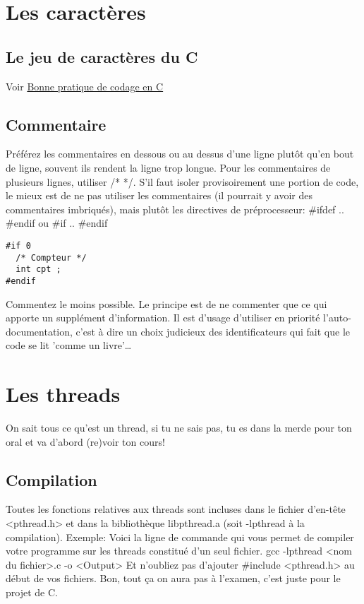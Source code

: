 \documentclass[a4paper]{article}
\begin{document}
\section{Les caractères}
\subsection{Le jeu de caractères du C}
Voir \href{http://emmanuel-delahaye.developpez.com/tutoriels/c/bonnes-pratiques-codage-c/#LI-A}{Bonne pratique de codage en C}
\subsection{Commentaire}
Préférez les commentaires en dessous ou au dessus d'une ligne plutôt qu'en bout de ligne, souvent ils rendent la ligne trop longue. \newline
Pour les commentaires de plusieurs lignes, utiliser /* */.\newline
S'il faut isoler provisoirement une portion de code, le mieux est de ne pas utiliser les commentaires (il pourrait y avoir des commentaires imbriqués), mais plutôt les directives de préprocesseur: \#ifdef .. \#endif ou \#if .. \#endif

\begin{lstlisting}
#if 0
  /* Compteur */
  int cpt ;
#endif
\end{lstlisting}
Commentez le moins possible. Le principe est de ne commenter que ce qui apporte un supplément d'information. Il est d'usage d'utiliser en priorité l'auto-documentation, c'est à dire un choix judicieux des identificateurs qui fait que le code se lit 'comme un livre'…
\section{Les threads}
On sait tous ce qu'est un thread, si tu ne sais pas, tu es dans la merde pour ton oral et va d'abord (re)voir ton cours!
\subsection{Compilation}
Toutes les fonctions relatives aux threads sont incluses dans le fichier d'en-tête <pthread.h> et dans la bibliothèque libpthread.a (soit -lpthread à la compilation).\newline
Exemple:\newline
Voici la ligne de commande qui vous permet de compiler votre programme sur les threads constitué d'un seul fichier.\newline
gcc -lpthread <nom du fichier>.c -o <Output>\newline
Et n'oubliez pas d'ajouter \#include <pthread.h> au début de vos fichiers.
Bon, tout ça on aura pas à l'examen, c'est juste pour le projet de C.
\end{document}
